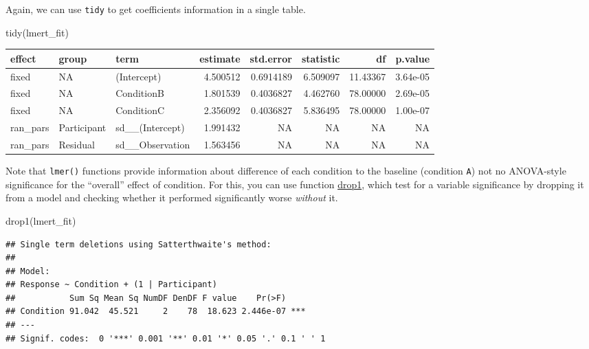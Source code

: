 \documentclass[
]{book}
\newenvironment{Shaded}{\begin{snugshade}}{\end{snugshade}}
\newcommand{\FunctionTok}[1]{\textcolor[rgb]{0.00,0.00,0.00}{#1}}
\newcommand{\NormalTok}[1]{#1}
\begin{document}
Again, we can use \texttt{tidy} to get coefficients information in a single table.

\begin{Shaded}
\begin{Highlighting}[]
\FunctionTok{tidy}\NormalTok{(lmert\_fit)}
\end{Highlighting}
\end{Shaded}

\begin{tabular}{l|l|l|r|r|r|r|r}
\hline
effect & group & term & estimate & std.error & statistic & df & p.value\\
\hline
fixed & NA & (Intercept) & 4.500512 & 0.6914189 & 6.509097 & 11.43367 & 3.64e-05\\
\hline
fixed & NA & ConditionB & 1.801539 & 0.4036827 & 4.462760 & 78.00000 & 2.69e-05\\
\hline
fixed & NA & ConditionC & 2.356092 & 0.4036827 & 5.836495 & 78.00000 & 1.00e-07\\
\hline
ran\_pars & Participant & sd\_\_(Intercept) & 1.991432 & NA & NA & NA & NA\\
\hline
ran\_pars & Residual & sd\_\_Observation & 1.563456 & NA & NA & NA & NA\\
\hline
\end{tabular}

Note that \texttt{lmer()} functions provide information about difference of each condition to the baseline (condition \texttt{A}) not no ANOVA-style significance for the ``overall'' effect of condition. For this, you can use function \href{https://stat.ethz.ch/R-manual/R-devel/library/stats/html/add1.html}{drop1}, which test for a variable significance by dropping it from a model and checking whether it performed significantly worse \emph{without} it.

\begin{Shaded}
\begin{Highlighting}[]
\FunctionTok{drop1}\NormalTok{(lmert\_fit)}
\end{Highlighting}
\end{Shaded}

\begin{verbatim}
## Single term deletions using Satterthwaite's method:
## 
## Model:
## Response ~ Condition + (1 | Participant)
##           Sum Sq Mean Sq NumDF DenDF F value    Pr(>F)    
## Condition 91.042  45.521     2    78  18.623 2.446e-07 ***
## ---
## Signif. codes:  0 '***' 0.001 '**' 0.01 '*' 0.05 '.' 0.1 ' ' 1
\end{verbatim}
\end{document}
